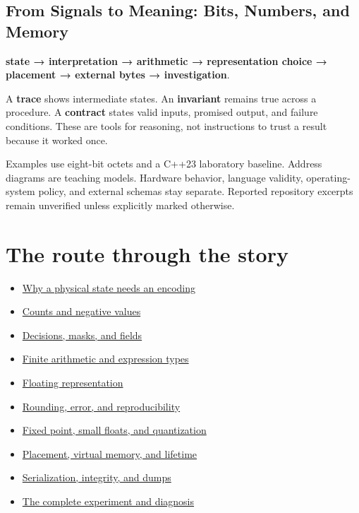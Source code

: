\subsection{From Signals to Meaning: Bits, Numbers, and Memory}\label{05-engine-i-ch001-from-signals-to-meaning-bits-numbers-and-memory}

\textbf{state → interpretation → arithmetic → representation choice → placement → external bytes → investigation}.

A \textbf{trace} shows intermediate states. An \textbf{invariant} remains true across a procedure. A \textbf{contract} states valid inputs, promised output, and failure conditions. These are tools for reasoning, not instructions to trust a result because it worked once.

Examples use eight-bit octets and a C++23 laboratory baseline. Address diagrams are teaching models. Hardware behavior, language validity, operating-system policy, and external schemas stay separate. Reported repository excerpts remain unverified unless explicitly marked otherwise.

\section{The route through the story}\label{05-engine-i-ch001-the-route-through-the-story}

\begin{itemize}
\tightlist
\item
  \hyperref[05-engine-i-ch001-prologue---how-a-physical-state-became-a-byte]{Why a physical state needs an encoding}
\item
  \hyperref[05-engine-i-ch001-from-a-signal-to-an-interpretation]{Counts and negative values}
\item
  \hyperref[05-engine-i-ch001-bits-become-decisions-and-compact-fields]{Decisions, masks, and fields}
\item
  \hyperref[05-engine-i-ch001-arithmetic-becomes-a-policy]{Finite arithmetic and expression types}
\item
  \hyperref[05-engine-i-ch001-a-stretching-ruler-for-real-valued-quantities]{Floating representation}
\item
  \hyperref[05-engine-i-ch001-when-arithmetic-meets-uncertainty]{Rounding, error, and reproducibility}
\item
  \hyperref[05-engine-i-ch001-choosing-what-information-to-keep]{Fixed point, small floats, and quantization}
\item
  \hyperref[05-engine-i-ch002-where-the-bytes-live]{Placement, virtual memory, and lifetime}
\item
  \hyperref[05-engine-i-ch002-bytes-become-a-durable-agreement]{Serialization, integrity, and dumps}
\item
  \hyperref[05-engine-i-ch002]{The complete experiment and diagnosis}
\end{itemize}

